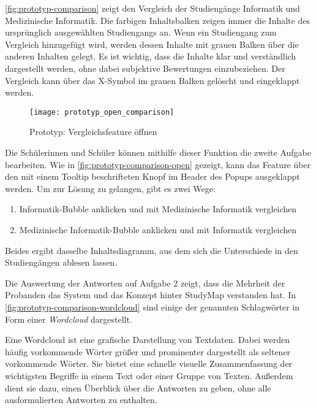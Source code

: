 \autoref{fig:prototyp-comparison} zeigt den Vergleich der Studiengänge Informatik und Medizinische Informatik. Die farbigen Inhaltsbalken zeigen immer die Inhalte des ursprünglich ausgewählten Studiengangs an. Wenn ein Studiengang zum Vergleich hinzugefügt wird, werden dessen Inhalte mit grauen Balken über die anderen Inhalten gelegt. Es ist wichtig, dass die Inhalte klar und verständlich dargestellt werden, ohne dabei subjektive Bewertungen einzubeziehen. Der Vergleich kann über das X-Symbol im grauen Balken gelöscht und eingeklappt werden.

\begin{figure}[H]
    \centering
    \texttt{[image: prototyp\_open\_comparison]}
    \caption{Prototyp: Vergleichsfeature öffnen}
    \label{fig:prototyp-comparison-open}
\end{figure}

Die Schülerinnen und Schüler können mithilfe dieser Funktion die zweite Aufgabe bearbeiten. Wie in \autoref{fig:prototyp-comparison-open} gezeigt, kann das Feature über den mit einem Tooltip beschrifteten Knopf im Header des Popups ausgeklappt werden. Um zur Lösung zu gelangen, gibt es zwei Wege:

\begin{enumerate}
    \item Informatik-Bubble anklicken und mit Medizinische Informatik vergleichen
    \item \glqq Medizinische Informatik\grqq{}-Bubble anklicken und mit Informatik vergleichen
\end{enumerate}

Beides ergibt dasselbe Inhaltsdiagramm, aus dem sich die Unterschiede in den Studiengängen ablesen lassen.

Die Auswertung der Antworten auf Aufgabe 2 zeigt, dass die Mehrheit der Probanden das System und das Konzept hinter StudyMap verstanden hat. In \autoref{fig:prototyp-comparison-wordcloud} sind einige der genannten Schlagwörter in Form einer \textit{Wordcloud} dargestellt.

Eine Wordcloud ist eine grafische Darstellung von Textdaten. Dabei werden häufig vorkommende Wörter größer und prominenter dargestellt als seltener vorkommende Wörter. Sie bietet eine schnelle visuelle Zusammenfassung der wichtigsten Begriffe in einem Text oder einer Gruppe von Texten. Außerdem dient sie dazu, einen Überblick über die Antworten zu geben, ohne alle ausformulierten Antworten zu enthalten.

